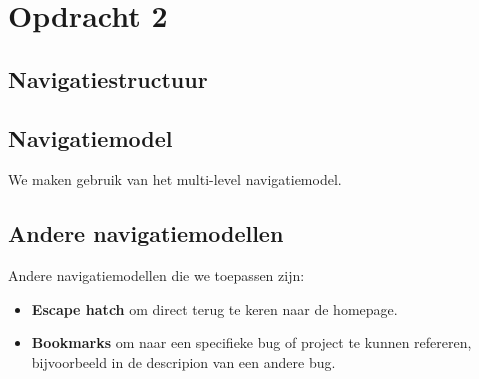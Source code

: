 \documentclass[11pt,english]{article}
\begin{document}
  \newpage
  \section{Opdracht 2}
  \subsection{Navigatiestructuur}

  \subsection{Navigatiemodel}
  We maken gebruik van het multi-level navigatiemodel.

  \subsection{Andere navigatiemodellen}
  Andere navigatiemodellen die we toepassen zijn:
  \begin{itemize}
    \item \textbf{Escape hatch} om direct terug te keren naar de homepage.
    \item \textbf{Bookmarks} om naar een specifieke bug of project te kunnen
      refereren, bijvoorbeeld in de descripion van een andere bug.
  \end{itemize}
\end{document}
